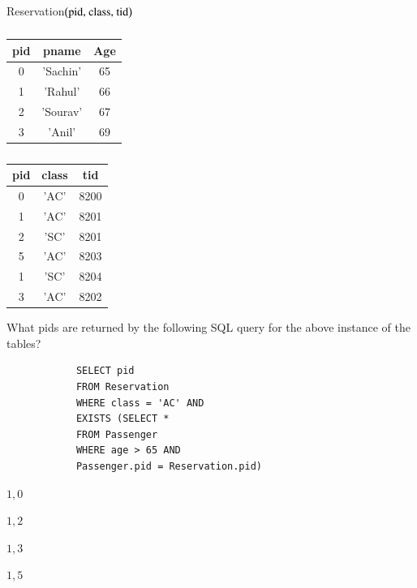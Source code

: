 \documentclass[journal,12pt,onecolumn]{IEEEtran}
\theoremstyle{remark}
\begin{document}
\begin{enumerate}
		Reservation$\left(\text{pid, class, tid}\right)$
		
		\begin{table}[h]
			\centering
			\caption*{}
			\label{tab:passenger}
			\begin{tabular}{|c|c|c|}
				\hline
				pid & pname & Age \\
				\hline
				0 & 'Sachin' & 65 \\
				1 & 'Rahul' & 66 \\
				2 & 'Sourav' & 67 \\
				3 & 'Anil' & 69 \\
				\hline
			\end{tabular}
		\end{table}
		
		\begin{table}[h]
			\centering
			\caption*{}
			\label{tab:reservation}
			\begin{tabular}{|c|c|c|}
				\hline
				pid & class & tid \\
				\hline
				0 & 'AC' & 8200 \\
				1 & 'AC' & 8201 \\
				2 & 'SC' & 8201 \\
				5 & 'AC' & 8203 \\
				1 & 'SC' & 8204 \\
				3 & 'AC' & 8202 \\
				\hline
			\end{tabular}
		\end{table}
		
		What pids are returned by the following SQL query for the above instance of the tables?
		
		\begin{verbatim}
			SELECT pid
			FROM Reservation
			WHERE class = 'AC' AND
			EXISTS (SELECT *
			FROM Passenger
			WHERE age > 65 AND
			Passenger.pid = Reservation.pid)
		\end{verbatim}
		
		\hfill{}
		
		\begin{enumerate}
		\end{enumerate}
		

\end{enumerate}
\end{document}
